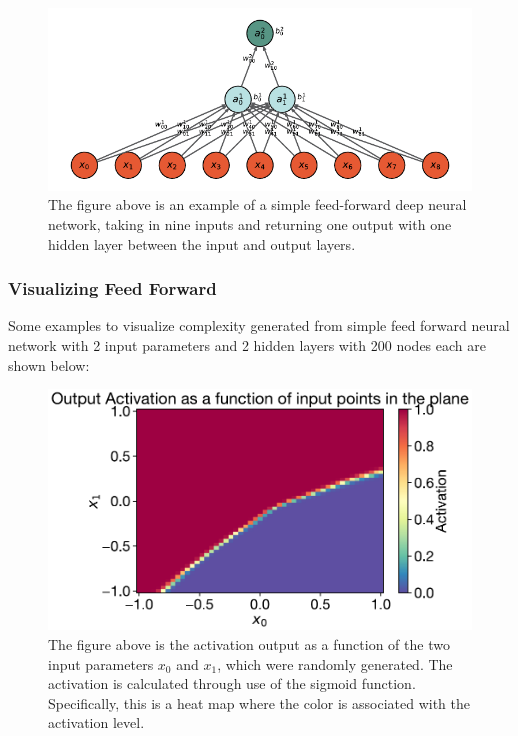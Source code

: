\begin{figure}[H]
\centering
\includegraphics{../figures/DNN.pdf}
\caption{The figure above is an example of a simple feed-forward deep neural network, taking in nine inputs and returning one output with one hidden layer between the input and output layers.}
\end{figure}
			
\subsubsection{Visualizing Feed Forward}

Some examples to visualize complexity generated from simple feed forward neural network with 2 input parameters and 2 hidden layers with 200 nodes each are shown below:

\begin{figure}[H]
\centering
\includegraphics[scale=0.65]{../figures/activation_heat_map.pdf}
\caption{The figure above is the activation output as a function of the two input parameters $x_0$ and $x_1$, which were randomly generated. The activation is calculated through use of the sigmoid function. Specifically, this is a heat map where the color is associated with the activation level.}
\end{figure}

